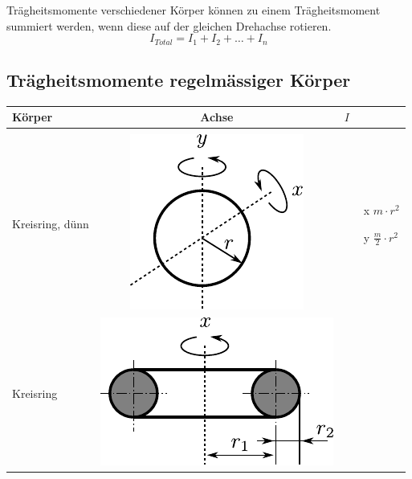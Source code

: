 \noindent
Trägheitsmomente verschiedener Körper können zu einem Trägheitsmoment
summiert werden, wenn diese auf der gleichen Drehachse rotieren.
\[ \boxed{
	I_{Total} = I_1 + I_2 + \dots + I_n
} \]

\newpage
\subsection{Trägheitsmomente regelmässiger Körper}

\begin{table}[h!]
\centering
\begin{tabular}{m{2cm} c m{}}
Körper	& Achse	& $I$ \\
\hline
& & \\
Kreisring, dünn &
	\begin{minipage}{0.3\textwidth}
	\centering
	\includegraphics[scale=\traegscale]{traeg-kreisring-duenn.pdf}
	\end{minipage} &
		\begin{itemize}
		\item[x] $m \cdot r^2$
		\item[y] $\frac{m}{2} \cdot r^2$
		\end{itemize} \\
Kreisring &
	\begin{minipage}{0.3\textwidth}
	\centering
	\includegraphics[scale=\traegscale]{traeg-kreisring.pdf}
	\end{minipage} &
		\begin{itemize}

\end{itemize}
\end{tabular}
\end{table}
